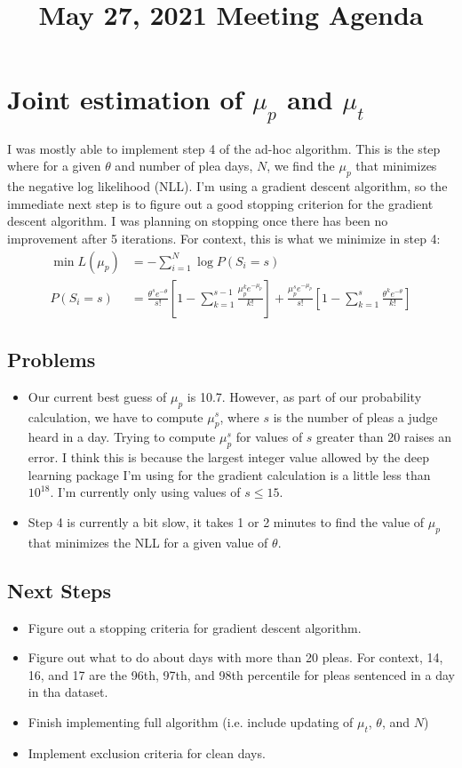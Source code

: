 \documentclass[11pt]{article}
\title{May 27, 2021 Meeting Agenda}
\begin{document}
\maketitle

\section{Joint estimation of $\mu_p$ and $\mu_t$}
I was mostly able to implement step 4 of the ad-hoc algorithm. This is the step where for a given $\theta$ and number of plea days, $N$, we find the $\mu_p$ that minimizes the negative log likelihood (NLL). I'm using a gradient descent algorithm, so the immediate next step is to figure out a good stopping criterion for the gradient descent algorithm. I was planning on stopping once there has been no improvement after 5 iterations. For context, this is what we minimize in step 4:
\begin{align*}
  \min L(\mu_p) &= -\sum_{i=1}^N \log P(S_i = s)\\
  P(S_i = s) &= \frac{\theta^s e^{-\theta}}{s!}[1-\sum_{k=1}^{s-1}\frac{\mu_p^k e^{-\mu_p}}{k!}] + \frac{\mu_p^s e^{-\mu_p}}{s!}[1-\sum_{k=1}^s \frac{\theta^k e^{-\theta}}{k!}]
\end{align*}
  \subsection{Problems}
    \begin{itemize}
      \item Our current best guess of $\mu_p$ is 10.7. However, as part of our probability calculation, we have to compute $\mu_p^s$, where $s$ is the number of pleas a judge heard in a day. Trying to compute $\mu_p^s$ for values of $s$ greater than 20 raises an error. I think this is because the largest integer value allowed by the deep learning package I'm using for the gradient calculation is a little less than $10^{18}$. I'm currently only using values of $s \leq 15$.
      \item Step 4 is currently a bit slow, it takes 1 or 2 minutes to find the value of $\mu_p$ that minimizes the NLL for a given value of $\theta$.
    \end{itemize}

  \subsection{Next Steps}
  \begin{itemize}
    \item Figure out a stopping criteria for gradient descent algorithm.
    \item Figure out what to do about days with more than 20 pleas. For context, 14, 16, and 17 are the 96th, 97th, and 98th percentile for pleas sentenced in a day in tha dataset.
    \item Finish implementing full algorithm (i.e. include updating of $\mu_t$, $\theta$, and $N$)
    \item Implement exclusion criteria for clean days.
  \end{itemize}
\end{document}
